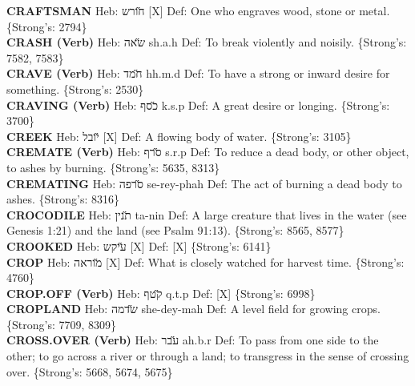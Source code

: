 {\textbf{CRAFTSMAN} Heb: {\large\H חורש} {[}X{]} Def: One who engraves wood, stone or metal. \{Strong's: 2794\}\hfill{}\\

\textbf{CRASH (Verb)} Heb: {\large\H שאה} sh.a.h Def: To break violently and noisily. \{Strong's: 7582, 7583\}\hfill{}\\

\textbf{CRAVE (Verb)} Heb: {\large\H חמד} hh.m.d Def: To have a strong or inward desire for something. \{Strong's: 2530\}\hfill{}\\

\textbf{CRAVING (Verb)} Heb: {\large\H כסף} k.s.p Def: A great desire or longing. \{Strong's: 3700\}\hfill{}\\

\textbf{CREEK} Heb: {\large\H יובל} {[}X{]} Def: A flowing body of water. \{Strong's: 3105\}\hfill{}\\

\textbf{CREMATE (Verb)} Heb: {\large\H סרף} s.r.p Def: To reduce a dead body, or other object, to ashes by burning. \{Strong's: 5635, 8313\}\hfill{}\\

\textbf{CREMATING} Heb: {\large\H סרפה} se-rey-phah Def: The act of burning a dead body to ashes. \{Strong's: 8316\}\hfill{}\\

\textbf{CROCODILE} Heb: {\large\H תנין} ta-nin Def: A large creature that lives in the water (see Genesis 1:21) and the land (see Psalm 91:13). \{Strong's: 8565, 8577\}\hfill{}\\

\textbf{CROOKED} Heb: {\large\H עיקש} {[}X{]} Def: {[}X{]} \{Strong's: 6141\}\hfill{}\\

\textbf{CROP} Heb: {\large\H מוראה} {[}X{]} Def: What is closely watched for harvest time. \{Strong's: 4760\}\hfill{}\\

\textbf{CROP.OFF (Verb)} Heb: {\large\H קטף} q.t.p Def: {[}X{]} \{Strong's: 6998\}\hfill{}\\

\textbf{CROPLAND} Heb: {\large\H שדמה} she-dey-mah Def: A level field for growing crops. \{Strong's: 7709, 8309\}\hfill{}\\

\textbf{CROSS.OVER (Verb)} Heb: {\large\H עבר} ah.b.r Def: To pass from one side to the other; to go across a river or through a land; to transgress in the sense of crossing over. \{Strong's: 5668, 5674, 5675\}\hfill{}\\

}
